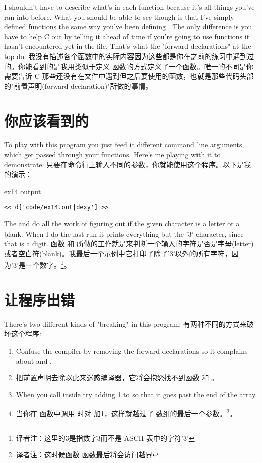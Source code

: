 I shouldn't have to describe what's in each function because it's all
things you've ran into before.  What you should be able to see though
is that I've simply defined functions the same way you've been defining
.  The only difference is you have to help C out by telling
it ahead of time if you're going to use functions it hasn't encountered
yet in the file.  That's what the "forward declarations" at the top do.
我没有描述各个函数中的实际内容因为这些都是你在之前的练习中遇到过的。你能看到的是我用类似于定义  函数的方式定义了一个函数。唯一的不同是你需要告诉 C 那些还没有在文件中遇到但之后要使用的函数，也就是那些代码头部的"前置声明(forward declaration)"所做的事情。

\section{你应该看到的}

To play with this program you just feed it different command line 
arguments, which get passed through your functions.  Here's me
playing with it to demonstrate:
只要在命令行上输入不同的参数，你就能使用这个程序。以下是我的演示：
\begin{code}{ex14 output}
\begin{lstlisting}
<< d['code/ex14.out|dexy'] >>
\end{lstlisting}
\end{code}

The  and  do all the work of figuring
out if the given character is a letter or a blank.  When I do the
last run it prints everything but the '3' character, since that 
is a digit.
函数  和  所做的工作就是来判断一个输入的字符是否是字母(letter)或者空白符(blank)。我最后一个示例中它打印了除了'3'以外的所有字符，因为'3'是一个数字。\footnote{译者注：这里的3是指数字3而不是 ASCII 表中的字符'3'}。
\section{让程序出错}

There's two different kinds of "breaking" in this program:
有两种不同的方式来破坏这个程序:
\begin{enumerate}
\item Confuse the compiler by removing the forward declarations
    so it complains about  and .
\item 把前置声明去除以此来迷惑编译器，它将会抱怨找不到函数  和 。
\item When you call  inside  try
    adding 1 to  so that it goes past the end of the
     array.
\item 当你在  函数中调用  时对  加1，这样就越过了  数组的最后一个参数。\footnote{译者注：这时候函数  函数最后将会访问越界}。
\end{enumerate}


